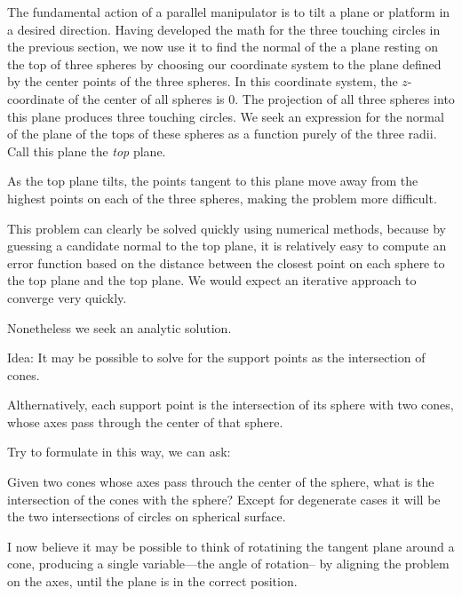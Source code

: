 \documentclass{article}
\begin{document}
The fundamental action of a parallel manipulator is to tilt a plane or platform in a desired direction.
Having developed the math for the three touching circles in the previous section, we now use it
to find the normal of the a plane resting on the top of three spheres by choosing our
coordinate system to the plane defined by the center points of the three spheres.
In this coordinate system, the $z$-coordinate of the center of all spheres is $0$.
The projection of all three spheres into this plane produces three touching circles.
We seek an expression for the normal of the plane of the tops of these spheres as a function
purely of the three radii. Call this plane the {\em top} plane.

As the top plane tilts, the points tangent to this plane move away from the highest points on each of
the three spheres, making the problem more difficult.

This problem can clearly be solved quickly using numerical methods, because by guessing
a candidate normal to the top plane, it is relatively easy to compute an error function based
on the distance between the closest point on each sphere to the top plane and the top plane.
We would expect an iterative approach to converge very quickly.

Nonetheless we seek an analytic solution.


Idea: It may be possible to solve for the support points as the intersection of cones\cite{shene1994lower}.

Althernatively, each support point is the intersection of its sphere
with two cones, whose axes pass through the center of that
sphere.

Try to formulate in this way, we can ask:

Given two cones whose axes pass throuch the center of the sphere,
what is the intersection of the cones with the sphere? Except for
degenerate cases it will be the two intersections of circles on
spherical surface.

I now believe it may be possible to think of rotatining the tangent plane
around a cone, producing a single variable---the angle of rotation--
by aligning the problem on the axes, until the plane is in the correct
position.




\end{document}
